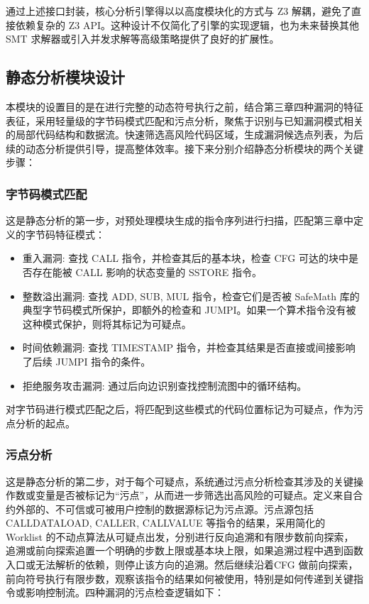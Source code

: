 \documentclass[print, master, vlined, timesmath]{DissertUESTC}
\begin{document}
通过上述接口封装，核心分析引擎得以以高度模块化的方式与 Z3 解耦，避免了直接依赖复杂的 Z3 API。这种设计不仅简化了引擎的实现逻辑，也为未来替换其他 SMT 求解器或引入并发求解等高级策略提供了良好的扩展性。

\subsection{静态分析模块设计}

本模块的设置目的是在进行完整的动态符号执行之前，结合第三章四种漏洞的特征表征，采用轻量级的字节码模式匹配和污点分析，聚焦于识别与已知漏洞模式相关的局部代码结构和数据流。快速筛选高风险代码区域，生成漏洞候选点列表，为后续的动态分析提供引导，提高整体效率。接下来分别介绍静态分析模块的两个关键步骤：

\subsubsection{字节码模式匹配}

这是静态分析的第一步，对预处理模块生成的指令序列进行扫描，匹配第三章中定义的字节码特征模式：

\begin{itemize}
    \item 重入漏洞: 查找 CALL 指令，并检查其后的基本块，检查 CFG 可达的块中是否存在能被 CALL 影响的状态变量的 SSTORE 指令。
    \item 整数溢出漏洞: 查找 ADD, SUB, MUL 指令，检查它们是否被 SafeMath 库的典型字节码模式所保护，即额外的检查和 JUMPI。如果一个算术指令没有被这种模式保护，则将其标记为可疑点。    
    \item 时间依赖漏洞: 查找 TIMESTAMP 指令，并检查其结果是否直接或间接影响了后续 JUMPI 指令的条件。
    \item 拒绝服务攻击漏洞: 通过后向边识别查找控制流图中的循环结构。
\end{itemize}

对字节码进行模式匹配之后，将匹配到这些模式的代码位置标记为可疑点，作为污点分析的起点。  



\subsubsection{污点分析}

这是静态分析的第二步，对于每个可疑点，系统通过污点分析检查其涉及的关键操作数或变量是否被标记为“污点”，从而进一步筛选出高风险的可疑点。定义来自合约外部的、不可信或可被用户控制的数据源标记为污点源。污点源包括 CALLDATALOAD, CALLER, CALLVALUE 等指令的结果，采用简化的 Worklist 的不动点算法从可疑点出发，分别进行反向追溯和有限步数前向探索，追溯或前向探索追置一个明确的步数上限或基本块上限，如果追溯过程中遇到函数入口或无法解析的依赖，则停止该方向的追溯。然后继续沿着CFG 做前向探索，前向符号执行有限步数，观察该指令的结果如何被使用，特别是如何传递到关键指令或影响控制流。四种漏洞的污点检查逻辑如下：
\end{document}
